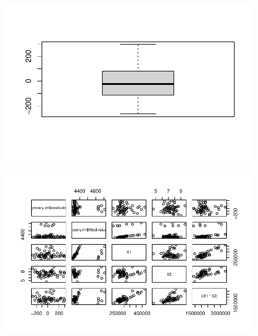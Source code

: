 \documentclass[
  letterpaper,
  DIV=11,
  numbers=noendperiod]{scrartcl}
\newenvironment{Shaded}{\begin{snugshade}}{\end{snugshade}}
\newcommand{\AttributeTok}[1]{\textcolor[rgb]{0.40,0.45,0.13}{#1}}
\newcommand{\FunctionTok}[1]{\textcolor[rgb]{0.28,0.35,0.67}{#1}}
\newcommand{\NormalTok}[1]{\textcolor[rgb]{0.00,0.23,0.31}{#1}}
\newcommand{\SpecialCharTok}[1]{\textcolor[rgb]{0.37,0.37,0.37}{#1}}
\begin{document}
\begin{figure}[H]

{\centering \includegraphics{sta9700_herlan_ch6_2023_04_12_files/figure-pdf/unnamed-chunk-8-1.pdf}

}

\end{figure}

\begin{Shaded}
\end{Shaded}

\begin{figure}[H]

{\centering \includegraphics{sta9700_herlan_ch6_2023_04_12_files/figure-pdf/unnamed-chunk-9-1.pdf}

}

\end{figure}
\end{document}
